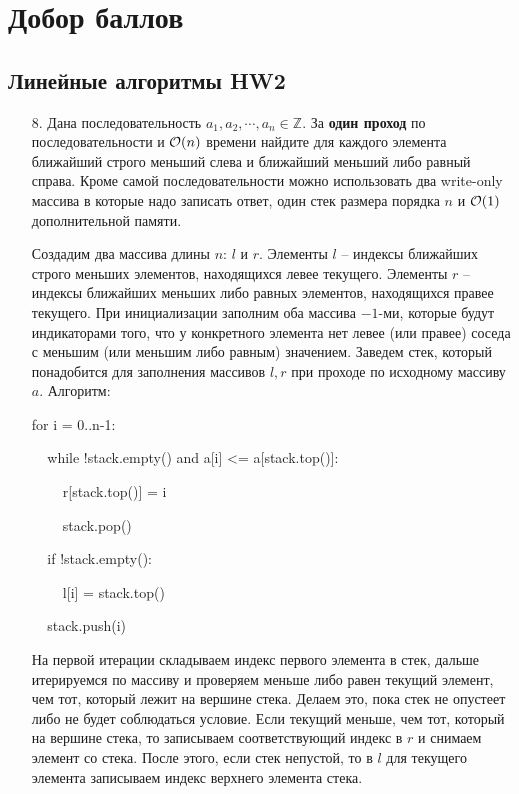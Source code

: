 \section{Добор баллов}

\subsection{Линейные алгоритмы HW2}
\begin{enumerate}
    
    \item[8.] %
        Дана последовательность $a_1, a_2, \cdots, a_n \in \mathbb{Z}$. За {\bf один проход}
        по последовательности и $\mathcal{O}(n)$ времени найдите для каждого элемента ближайший строго
        меньший слева и ближайший меньший либо равный справа. Кроме самой последовательности
        можно использовать два write-only массива в которые надо записать ответ, один стек
        размера порядка $n$ и $\mathcal{O}(1)$ дополнительной памяти.

    \begin{solution}
        Создадим два массива длины $n$: $l$ и $r$. Элементы $l$ -- индексы ближайших строго меньших элементов, находящихся левее текущего. Элементы $r$ -- индексы ближайших меньших либо равных элементов, находящихся правее текущего. При инициализации заполним оба массива $-1$-ми, которые будут индикаторами того, что у конкретного элемента нет левее (или правее) соседа с меньшим (или меньшим либо равным) значением. Заведем стек, который понадобится для заполнения массивов $l, r$ при проходе по исходному массиву $a$. Алгоритм:

        for i = 0..n-1:
        
        $\>$ $\>$ while !stack.empty() and a[i] <= a[stack.top()]:

        $\>$ $\>$ $\>$ $\>$ r[stack.top()] = i
       
        $\>$ $\>$ $\>$ $\>$ stack.pop()
        
        $\>$ $\>$ if !stack.empty():

        $\>$ $\>$ $\>$ $\>$ l[i] = stack.top()

        $\>$ $\>$ stack.push(i)

        На первой итерации складываем индекс первого элемента в стек, дальше итерируемся по массиву и проверяем меньше либо равен текущий элемент, чем тот, который лежит на вершине стека. Делаем это, пока стек не опустеет либо не будет соблюдаться условие. Если текущий меньше, чем тот, который на вершине стека, то записываем соответствующий индекс в $r$ и снимаем элемент со стека. После этого, если стек непустой, то в $l$ для текущего элемента записываем индекс верхнего элемента стека.


\end{solution}
\end{enumerate}
